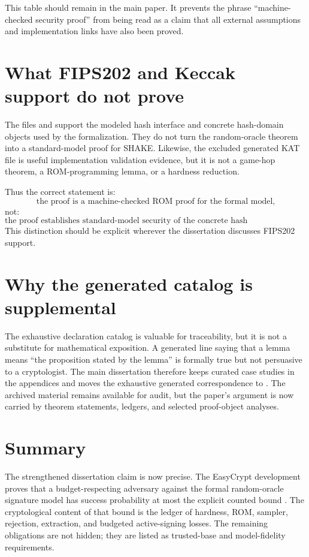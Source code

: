 This table should remain in the main paper.  It prevents the phrase
``machine-checked security proof'' from being read as a claim that all external
assumptions and implementation links have also been proved.

\section{What FIPS202 and Keccak support do not prove}
\label{sec:synthesis-fips-boundary}

The files  and  support the
modeled hash interface and concrete hash-domain objects used by the formalization.
They do not turn the random-oracle theorem into a standard-model proof for
SHAKE.  Likewise, the excluded generated KAT file is useful implementation
validation evidence, but it is not a game-hop theorem, a ROM-programming lemma,
or a hardness reduction.

Thus the correct statement is:
\[
  \text{the proof is a machine-checked ROM proof for the formal model,}
\]
not:
\[
  \text{the proof establishes standard-model security of the concrete hash
  implementation.}
\]
This distinction should be explicit wherever the dissertation discusses FIPS202
support.

\section{Why the generated catalog is supplemental}
\label{sec:synthesis-generated-catalog}

The exhaustive declaration catalog is valuable for traceability, but it is not a
substitute for mathematical exposition.  A generated line saying that a lemma
means ``the proposition stated by the lemma'' is formally true but not persuasive
to a cryptologist.  The main dissertation therefore keeps curated case studies
in the appendices and moves the exhaustive generated correspondence to
.  The archived material remains available for audit, but
the paper's argument is now carried by theorem statements, ledgers, and selected
proof-object analyses.

\section{Summary}
\label{sec:synthesis-summary-rewritten}

The strengthened dissertation claim is now precise.  The EasyCrypt development
proves that a budget-respecting adversary against the formal random-oracle
\haetae{} signature model has success probability at most the explicit counted
bound .  The cryptological content of that
bound is the ledger of hardness, ROM, sampler, rejection, extraction, and
budgeted active-signing losses.  The remaining obligations are not hidden; they
are listed as trusted-base and model-fidelity requirements.
